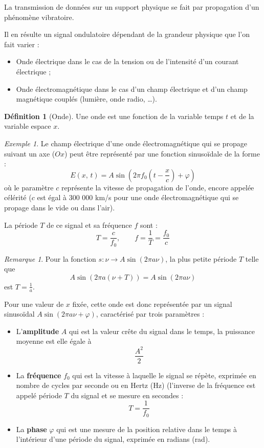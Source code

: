 \documentclass[11pt,english,french]{scrreprt}
\theoremstyle{remark}
\newtheorem*{rem*}{Remarque}
\newtheorem*{ex*}{Exemple}
\theoremstyle{definition}
\newtheorem*{def*}{Définition}
\begin{document}
La transmission de données sur un support physique se fait par propagation d'un phénomène vibratoire.

Il en résulte un signal ondulatoire dépendant de la grandeur physique que l'on fait varier :\begin{itemize}
	\item Onde électrique dans le cas de la tension ou de l'intensité d'un courant électrique ;
	\item Onde électromagnétique dans le cas d'un champ électrique et d'un champ magnétique couplés (lumière, onde radio, \dots).
\end{itemize}

\vspace{10pt}
\begin{def*}[Onde]
	Une onde est une fonction de la variable temps $t$ et de la variable espace $x$.
\end{def*}

\begin{ex*}
	Le champ électrique d'une onde électromagnétique qui se propage suivant un axe ($Ox$) peut être représenté par une fonction sinusoïdale de la forme :
	\[
		E\left(x,\, t\right)=A\sin\left(2\pi f_{0}\left(t-\frac{x}{c}\right)+\varphi\right)
	\]
	où le paramètre $c$ représente la vitesse de propagation de l'onde, encore appelée célérité ($c$ est égal à 300 000 km/s pour une onde électromagnétique qui se propage dans le vide ou dans l'air).

	La période $T$ de ce signal et sa fréquence $f$ sont :
	\[
		T=\frac{c}{f_0},\qquad f=\frac{1}{T}=\frac{f_0}{c}
	\]
\end{ex*}

\begin{rem*}
	Pour la fonction $s\colon\nu\longrightarrow A\sin(2\pi a\nu)$, la plus petite période $T$ telle que \[
		A\sin(2\pi a(\nu+T))=A\sin(2\pi a\nu)
	\]est $T=\frac{1}{a}$.
\end{rem*}

Pour une valeur de $x$ fixée, cette onde est donc représentée par un signal sinusoïdal $A\sin(2\pi a\nu+\varphi)$, caractérisé par trois paramètres :\begin{itemize}
	\item L'\textbf{amplitude} $A$ qui est la valeur crête du signal dans le temps, la puissance moyenne est elle égale à \[
	\frac{A^2}{2}\]
	\item La \textbf{fréquence} $f_0$ qui est la vitesse à laquelle le signal se répète, exprimée en nombre de cycles par seconde ou en Hertz (Hz) (l'inverse de la fréquence est appelé période $T$ du signal et se mesure en secondes : \[T=\frac{1}{f_0}\]
	\item La \textbf{phase} $\varphi$ qui est une mesure de la position relative dans le temps à l'intérieur d'une période du signal, exprimée en radians (rad).
\end{itemize}
\end{document}
